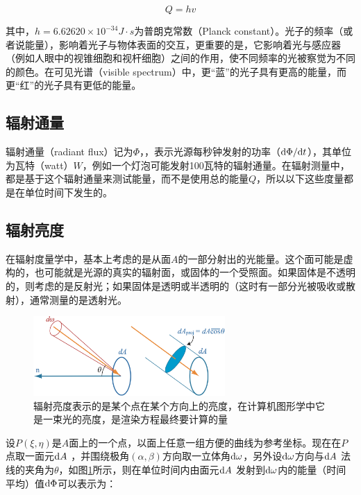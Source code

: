 \begin{equation}
	Q=hv
\end{equation}

\noindent 其中，$h=6.62620\times 10^{-34} J\cdot s$为普朗克常数（Planck constant）。光子的频率（或者说能量），影响着光子与物体表面的交互，更重要的是，它影响着光与感应器（例如人眼中的视锥细胞和视杆细胞）之间的作用，使不同频率的光被察觉为不同的颜色。在可见光谱（visible spectrum）中，更“蓝”的光子具有更高的能量，而更“红”的光子具有更低的能量。 



\subsection{辐射通量}
辐射通量（radiant flux）记为$\Phi$，，表示光源每秒钟发射的功率（${\rm d}\Phi/{\rm d}t$），其单位为瓦特（watt）$W$，例如一个灯泡可能发射100瓦特的辐射通量。在辐射测量中，都是基于这个辐射通量来测试能量，而不是使用总的能量$Q$，所以以下这些度量都是在单位时间下发生的。





\subsection{辐射亮度}
在辐射度量学中，基本上考虑的是从面$A$的一部分射出的光能量。这个面可能是虚构的，也可能就是光源的真实的辐射面，或固体的一个受照面。如果固体是不透明的，则考虑的是反射光；如果固体是透明或半透明的（这时有一部分光被吸收或散射），通常测量的是透射光。

\begin{figure}
\sidecaption
	\includegraphics[width=0.65\textwidth]{figures/intro/radiance}
	\caption{辐射亮度表示的是某个点在某个方向上的亮度，在计算机图形学中它是一束光的亮度，是渲染方程最终要计算的量}
	\label{f:intro-radiance}
\end{figure}

设$P(\xi,\eta)$是$A$面上的一个点，以面上任意一组方便的曲线为参考坐标。现在在$P$点取一面元${\rm d}A$ ，并围绕极角$(\alpha,\beta)$方向取一立体角${\rm d}\omega$，另外设${\rm d}\omega$方向与${\rm d}A$ 法线的夹角为$\theta$，如图\ref{f:intro-radiance}所示，则在单位时间内由面元${\rm d}A$ 发射到${\rm d}\omega$内的能量（时间平均）值${\rm d}\Phi$可以表示为：

